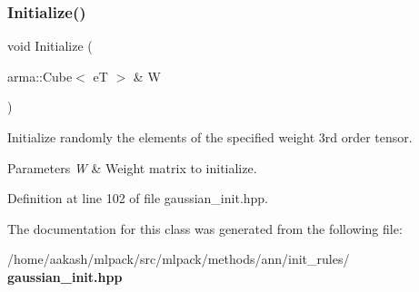 \subsubsection{Initialize()\hspace{0.1cm}{\footnotesize\ttfamily [4/4]}}
{\footnotesize\ttfamily void Initialize (\begin{DoxyParamCaption}\item[{arma\+::\+Cube$<$ eT $>$ \&}]{W }\end{DoxyParamCaption})\hspace{0.3cm}{\ttfamily [inline]}}



Initialize randomly the elements of the specified weight 3rd order tensor. 


\begin{DoxyParams}{Parameters}
{\em W} & Weight matrix to initialize. \\
\hline
\end{DoxyParams}


Definition at line 102 of file gaussian\+\_\+init.\+hpp.



The documentation for this class was generated from the following file\+:\begin{DoxyCompactItemize}
\item 
/home/aakash/mlpack/src/mlpack/methods/ann/init\+\_\+rules/\textbf{ gaussian\+\_\+init.\+hpp}\end{DoxyCompactItemize}
